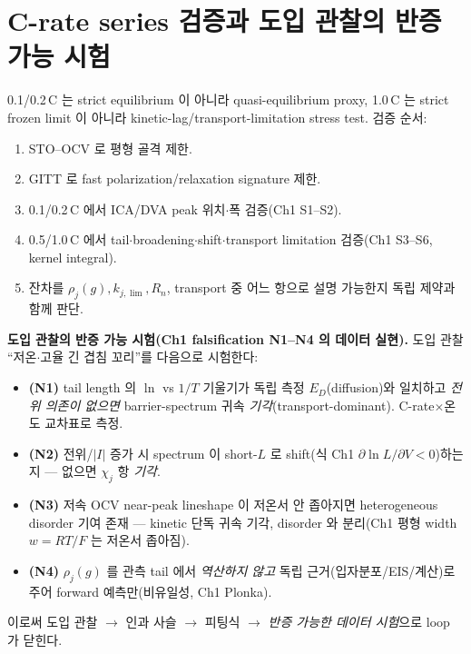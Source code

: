 \section{C-rate series 검증과 도입 관찰의 반증 가능 시험}\label{sec:ch6_crate}
0.1/0.2\,C 는 strict equilibrium 이 아니라 quasi-equilibrium proxy, 1.0\,C 는 strict frozen limit 이 아니라
kinetic-lag/transport-limitation stress test. 검증 순서:
\begin{enumerate}[label=C\arabic*),leftmargin=2.2em]
\item STO--OCV 로 평형 골격 제한.
\item GITT 로 fast polarization/relaxation signature 제한.
\item 0.1/0.2\,C 에서 ICA/DVA peak 위치$\cdot$폭 검증(Ch1 S1--S2).
\item 0.5/1.0\,C 에서 tail$\cdot$broadening$\cdot$shift$\cdot$transport limitation 검증(Ch1 S3--S6, kernel integral).
\item 잔차를 $\rho_j(g),k_{j,\lim},R_n$, transport 중 어느 항으로 설명 가능한지 독립 제약과 함께 판단.
\end{enumerate}
\begin{loopbox}
\textbf{도입 관찰의 반증 가능 시험(Ch1 falsification N1--N4 의 데이터 실현).} 도입 관찰 ``저온$\cdot$고율 긴
겹침 꼬리''를 다음으로 시험한다:
\begin{itemize}[leftmargin=1.4em]
\item \textbf{(N1)} tail length 의 $\ln$ vs $1/T$ 기울기가 독립 측정 $E_D$(diffusion)와 일치하고 \emph{전위
  의존이 없으면} barrier-spectrum 귀속 \emph{기각}(transport-dominant). C-rate$\times$온도 교차표로 측정.
\item \textbf{(N2)} 전위/$|I|$ 증가 시 spectrum 이 short-$L$ 로 shift(식 Ch1 $\partial\ln L/\partial V<0$)하는지 —
  없으면 $\chi_j$ 항 \emph{기각}.
\item \textbf{(N3)} 저속 OCV near-peak lineshape 이 저온서 안 좁아지면 heterogeneous disorder 기여 존재 —
  kinetic 단독 귀속 기각, disorder 와 분리(Ch1 평형 width $w=RT/F$ 는 저온서 좁아짐).
\item \textbf{(N4)} $\rho_j(g)$ 를 관측 tail 에서 \emph{역산하지 않고} 독립 근거(입자분포/EIS/계산)로 주어
  forward 예측만(비유일성, Ch1 Plonka).
\end{itemize}
이로써 도입 관찰 $\to$ 인과 사슬 $\to$ 피팅식 $\to$ \emph{반증 가능한 데이터 시험}으로 loop 가 닫힌다.
\end{loopbox}

